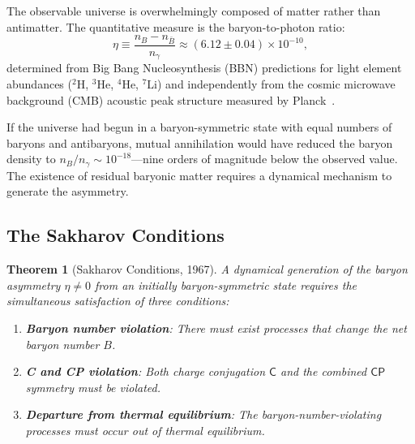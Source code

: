 \documentclass[12pt]{article}
\newtheorem{theorem}{Theorem}[section]
\theoremstyle{definition}
\theoremstyle{remark}
\newcommand{\C}{\mathsf{C}}
\newcommand{\CP}{\mathsf{CP}}
\begin{document}
The observable universe is overwhelmingly composed of matter rather than antimatter.
The quantitative measure is the baryon-to-photon ratio:
\begin{equation}
\label{eq:eta}
\eta \equiv \frac{n_B - n_{\bar{B}}}{n_\gamma} \approx (6.12 \pm 0.04) \times 10^{-10},
\end{equation}
determined from Big Bang Nucleosynthesis (BBN) predictions for light element abundances
(${}^2\text{H}$, ${}^3\text{He}$, ${}^4\text{He}$, ${}^7\text{Li}$) and independently
from the cosmic microwave background (CMB) acoustic peak structure measured by
Planck~\cite{Planck2018}.

If the universe had begun in a baryon-symmetric state with equal numbers of baryons
and antibaryons, mutual annihilation would have reduced the baryon density to
$n_B/n_\gamma \sim 10^{-18}$---nine orders of magnitude below the observed value.
The existence of residual baryonic matter requires a dynamical mechanism to generate
the asymmetry.

\subsection{The Sakharov Conditions}

\begin{theorem}[Sakharov Conditions, 1967]
\label{thm:sakharov}
A dynamical generation of the baryon asymmetry $\eta \neq 0$ from an initially
baryon-symmetric state requires the simultaneous satisfaction of three conditions:
\begin{enumerate}
    \item \textbf{Baryon number violation}: There must exist processes that change
    the net baryon number $B$.
    \item \textbf{C and CP violation}: Both charge conjugation $\C$ and the combined
    $\CP$ symmetry must be violated.
    \item \textbf{Departure from thermal equilibrium}: The baryon-number-violating
    processes must occur out of thermal equilibrium.
\end{enumerate}
\end{theorem}
\end{document}
